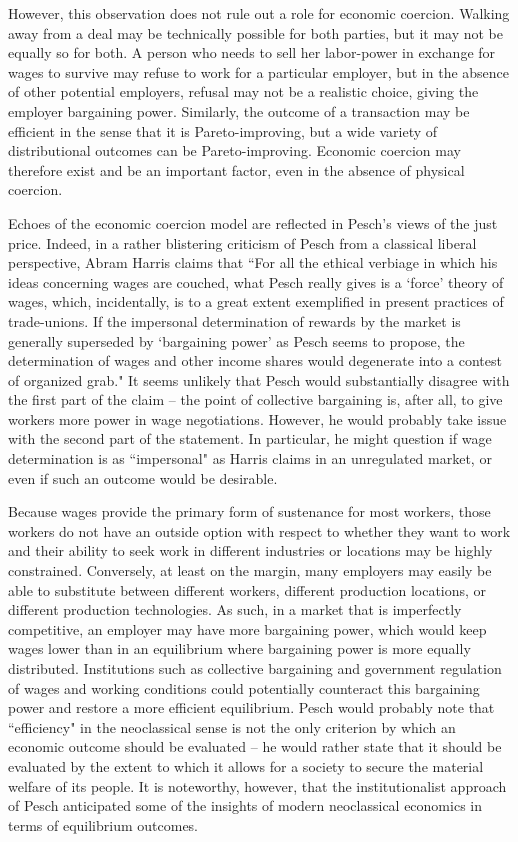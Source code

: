 \documentclass{article}
\begin{document}
However, this observation does not rule out a role for economic coercion.  Walking away from a deal may be technically possible for both parties, but it may not be equally so for both.  A person who needs to sell her labor-power in exchange for wages to survive may refuse to work for a particular employer, but in the absence of other potential employers, refusal may not be a realistic choice, giving the employer bargaining power.  Similarly, the outcome of a transaction may be efficient in the sense that it is Pareto-improving, but a wide variety of distributional outcomes can be Pareto-improving.  Economic coercion may therefore exist and be an important factor, even in the absence of physical coercion.\medskip

Echoes of the economic coercion model are reflected in Pesch’s views of the just price.  Indeed, in a rather blistering criticism of Pesch from a classical liberal perspective, Abram Harris claims that ``For all the ethical verbiage in which his ideas concerning wages are couched, what Pesch really gives is a ‘force’ theory of wages, which, incidentally, is to a great extent exemplified in present practices of trade-unions.  If the impersonal determination of rewards by the market is generally superseded by ‘bargaining power’ as Pesch seems to propose, the determination of wages and other income shares would degenerate into a contest of organized grab." \citep[pp. 46-47]{harris1946}  It seems unlikely that Pesch would substantially disagree with the first part of the claim – the point of collective bargaining is, after all, to give workers more power in wage negotiations.  However, he would probably take issue with the second part of the statement.  In particular, he might question if wage determination is as ``impersonal" as Harris claims in an unregulated market, or even if such an outcome would be desirable.\medskip

Because wages provide the primary form of sustenance for most workers, those workers do not have an outside option with respect to whether they want to work and their ability to seek work in different industries or locations may be highly constrained.  Conversely, at least on the margin, many employers may easily be able to substitute between different workers, different production locations, or different production technologies.  As such, in a market that is imperfectly competitive, an employer may have more bargaining power, which would keep wages lower than in an equilibrium where bargaining power is more equally distributed.  Institutions such as collective bargaining and government regulation of wages and working conditions could potentially counteract this bargaining power and restore a more efficient equilibrium.  Pesch would probably note that ``efficiency" in the neoclassical sense is not the only criterion by which an economic outcome should be evaluated – he would rather state that it should be evaluated by the extent to which it allows for a society to secure the material welfare of its people.  It is noteworthy, however, that the institutionalist approach of Pesch anticipated some of the insights of modern neoclassical economics in terms of equilibrium outcomes.\medskip
\end{document}

